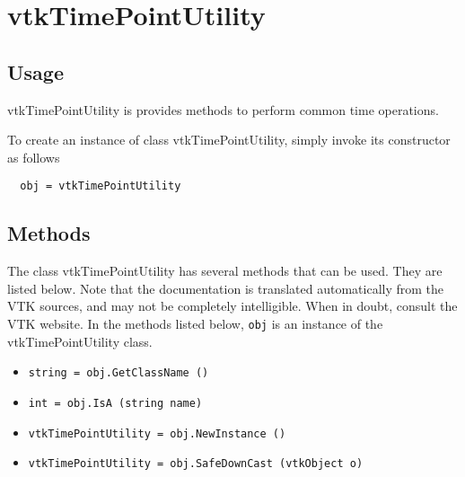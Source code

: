 \section{vtkTimePointUtility}

\subsection{Usage}


 vtkTimePointUtility is provides methods to perform common time operations.

To create an instance of class vtkTimePointUtility, simply
invoke its constructor as follows
\begin{verbatim}
  obj = vtkTimePointUtility
\end{verbatim}
\subsection{Methods}

The class vtkTimePointUtility has several methods that can be used.
  They are listed below.
Note that the documentation is translated automatically from the VTK sources,
and may not be completely intelligible.  When in doubt, consult the VTK website.
In the methods listed below, \verb|obj| is an instance of the vtkTimePointUtility class.
\begin{itemize}
\item  \verb|string = obj.GetClassName ()|

\item  \verb|int = obj.IsA (string name)|

\item  \verb|vtkTimePointUtility = obj.NewInstance ()|

\item  \verb|vtkTimePointUtility = obj.SafeDownCast (vtkObject o)|

\end{itemize}
